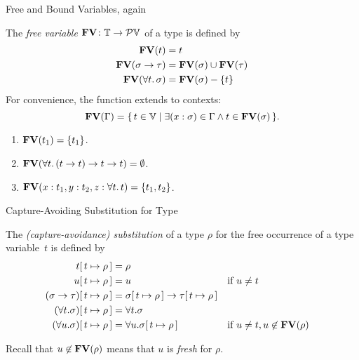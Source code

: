 \begin{frame}{Free and Bound Variables, again}
\begin{definition}
  The \emph{free variable} $\mathbf{FV}\colon \mathbb{T} \to \mathcal{P}\mathbb{V}$ of a type
  is defined by
  \begin{align*}
    \mathbf{FV}(t) & {} = t \\
    \mathbf{FV}(\sigma \to \tau) & {} = \mathbf{FV}(\sigma) \cup \mathbf{FV}(\tau) \\
    \mathbf{FV}(\forall t.\, \sigma) & {} = \mathbf{FV}(\sigma) - \{t\}
  \end{align*}
  For convenience, the function extends to contexts:
  \[
    \mathbf{FV}(\Gamma) = \{\, t \in \mathbb{V}\mid \exists (x : \sigma) \in \Gamma
      \wedge t \in \mathbf{FV}(\sigma) \,\}.
  \]
\end{definition}
  \begin{enumerate}
    \item $\mathbf{FV}(t_1) = \{t_1\}$.
    \item $\mathbf{FV}(\forall t.\, (t \to t) \to t \to t) = \emptyset$.
    \item $\mathbf{FV}(x : t_1, y : t_2, z : \forall t.\,t)
      = \{t_1, t_2\}$.
  \end{enumerate}
\end{frame}
\begin{frame}{Capture-Avoiding Substitution for Type}
  \begin{definition}
  The \emph{(capture-avoidance) substitution} of a type $\rho$ for the free
  occurrence of a type variable~$t$ is defined by 
  \begin{align*}
    t[\,t\mapsto\rho\,] & = \rho \\
    u[\,t\mapsto\rho\,] & = u && \text{if $u \neq t$}\\
    (\sigma\to\tau)[\,t\mapsto\rho\,] & =
    \sigma[\,t\mapsto\rho\,]\to
    \tau[\,t\mapsto\rho\,] \\
    (\forall t.\sigma)[\,t\mapsto\rho\,] & = \forall t.\sigma \\
    (\forall u.\sigma)[\,t\mapsto\rho\,] & = \forall u.\sigma[\,t\mapsto\rho\,]
                                      &&
    \text{if $u \neq t, u \not\in \mathbf{FV}(\rho)$} 
  \end{align*}
  \end{definition}
  Recall that $u \not\in \mathbf{FV}(\rho)$ means that $u$ is \emph{fresh} for $\rho$. 
\end{frame}

